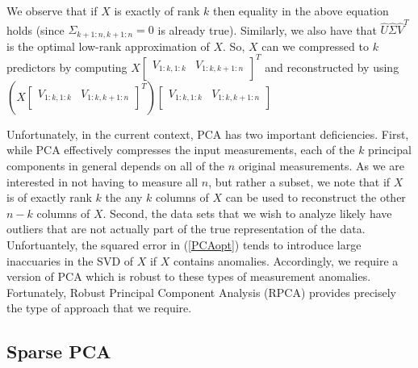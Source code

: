 \documentclass[conference]{IEEEtran}
\begin{document}
We observe that if $X$ is exactly of rank $k$ then equality in the above equation holds (since $\Sigma_{k+1:n,k+1:n}=0$ is already true).  Similarly, we also have that $\hat{U} \hat{\Sigma} \hat{V}^T$ is the optimal low-rank approximation of $X$.  So, $X$ can we compressed to $k$ predictors by computing $X \begin{bmatrix} V_{1:k,1:k} & V_{1:k,k+1:n} \\ \end{bmatrix}^T$ and reconstructed by using $(X \begin{bmatrix} V_{1:k,1:k} & V_{1:k,k+1:n} \\ \end{bmatrix}^T) \begin{bmatrix} V_{1:k,1:k} & V_{1:k,k+1:n} \\ \end{bmatrix}$


Unfortunately, in the current context, PCA has two important deficiencies.  First, while PCA effectively compresses the input measurements, each of the $k$ principal components in general depends on all of the $n$ original measurements.   As we are interested in not having to measure all $n$, but rather a subset, we note that if $X$ is of exactly rank $k$ the any $k$ columns of $X$ can be used to reconstruct the other $n-k$ columns of $X$.
Second, the data sets that we wish to analyze likely have outliers that are not actually part of the true representation of the data.  Unfortuantely, the squared error in (\ref{PCAopt}) tends to introduce large inaccuaries in the SVD of $X$ if $X$ contains anomalies.
Accordingly, we require a version of PCA which is robust to these types of measurement anomalies.   Fortunately, Robust Principal Component Analysis (RPCA) \cite{Candes2009,
 Candes2011, Chandrasekaran2009, Cai2010, Paffenroth2012a,Paffenroth2013b} provides precisely the type of approach that we require.   

\subsection{Sparse PCA}\label{SPCA}
\end{document}
